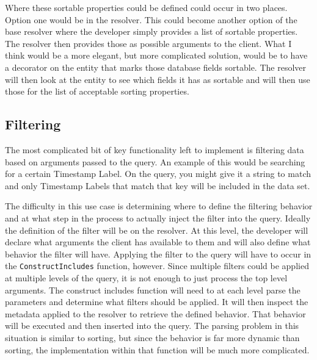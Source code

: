 Where these sortable properties could be defined could occur in two places.  Option one would be in the resolver.  This could become another option of the base resolver where the developer simply provides a list of sortable properties.  The resolver then provides those as possible arguments to the client.  What I think would be a more elegant, but more complicated solution, would be to have a decorator on the entity that marks those database fields sortable.  The resolver will then look at the entity to see which fields it has as sortable and will then use those for the list of acceptable sorting properties.

\subsection{Filtering}

The most complicated bit of key functionality left to implement is filtering data based on arguments passed to the query.  An example of this would be searching for a certain Timestamp Label.  On the query, you might give it a string to match and only Timestamp Labels that match that key will be included in the data set.

The difficulty in this use case is determining where to define the filtering behavior and at what step in the process to actually inject the filter into the query.  Ideally the definition of the filter will be on the resolver. At this level, the developer will declare what arguments the client has available to them and will also define what behavior the filter will have.  Applying the filter to the query will have to occur in the \verb!ConstructIncludes! function, however.  Since multiple filters could be applied at multiple levels of the query, it is not enough to just process the top level arguments.  The construct includes function will need to at each level parse the parameters and determine what filters should be applied.  It will then inspect the metadata applied to the resolver to retrieve the defined behavior.  That behavior will be executed and then inserted into the query.  The parsing problem in this situation is similar to sorting, but since the behavior is far more dynamic than sorting, the implementation within that function will be much more complicated.